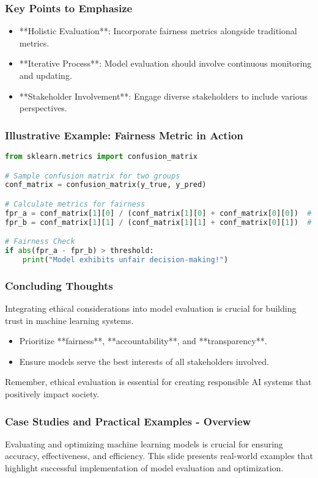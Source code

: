 \documentclass[aspectratio=169]{beamer}
\begin{document}
\begin{frame}
    \frametitle{Key Points to Emphasize}
    \begin{itemize}
        \item **Holistic Evaluation**: Incorporate fairness metrics alongside traditional metrics.
        \item **Iterative Process**: Model evaluation should involve continuous monitoring and updating.
        \item **Stakeholder Involvement**: Engage diverse stakeholders to include various perspectives.
    \end{itemize}
\end{frame}

\begin{frame}[fragile]
    \frametitle{Illustrative Example: Fairness Metric in Action}
    \begin{lstlisting}[language=Python, basicstyle=\footnotesize\ttfamily]
from sklearn.metrics import confusion_matrix

# Sample confusion matrix for two groups
conf_matrix = confusion_matrix(y_true, y_pred)

# Calculate metrics for fairness
fpr_a = conf_matrix[1][0] / (conf_matrix[1][0] + conf_matrix[0][0])  # False Positive Rate for Group A
fpr_b = conf_matrix[1][1] / (conf_matrix[1][1] + conf_matrix[0][1])  # False Positive Rate for Group B

# Fairness Check
if abs(fpr_a - fpr_b) > threshold:
    print("Model exhibits unfair decision-making!")
    \end{lstlisting}
\end{frame}

\begin{frame}
    \frametitle{Concluding Thoughts}
    Integrating ethical considerations into model evaluation is crucial for building trust in machine learning systems. 
    \begin{itemize}
        \item Prioritize **fairness**, **accountability**, and **transparency**.
        \item Ensure models serve the best interests of all stakeholders involved.
    \end{itemize}
    Remember, ethical evaluation is essential for creating responsible AI systems that positively impact society.
\end{frame}

\begin{frame}[fragile]
    \frametitle{Case Studies and Practical Examples - Overview}
    Evaluating and optimizing machine learning models is crucial for ensuring accuracy, effectiveness, and efficiency. 
    This slide presents real-world examples that highlight successful implementation of model evaluation and optimization.
\end{frame}
\end{document}
